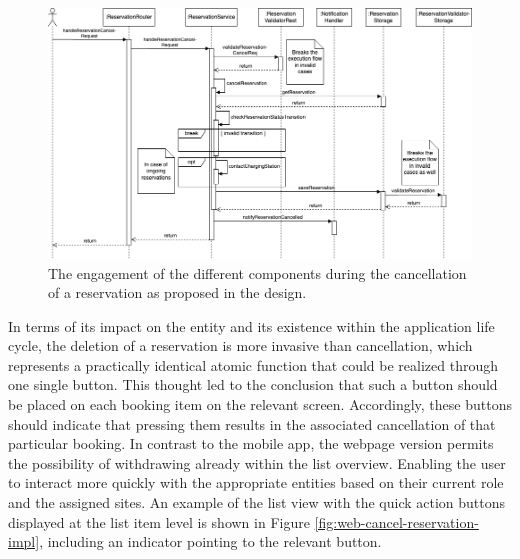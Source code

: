 \newpage

\begin{figure}[h]
    \centering
    \includegraphics[scale=0.4]{resources/images/main/6_implementation/processes/ReservationCancel.png}
    \caption{The engagement of the different components during the cancellation of a reservation as proposed in the design.}
    \label{fig:cancel-reservation-seqflow}
\end{figure}

\noindent In terms of its impact on the entity and its existence within the application life cycle, the deletion of a reservation is more invasive than cancellation, which represents a practically identical atomic function that could be realized through one single button. 
This thought led to the conclusion that such a button should be placed on each booking item on the relevant screen. Accordingly, these buttons should indicate that pressing them results in the associated cancellation of that particular booking.
In contrast to the mobile app, the webpage version permits the possibility of withdrawing already within the list overview. Enabling the user to interact more quickly with the appropriate entities based on their current role and the assigned sites.
An example of the list view with the quick action buttons displayed at the list item level is shown in Figure \ref{fig:web-cancel-reservation-impl}, including an indicator pointing to the relevant button.

